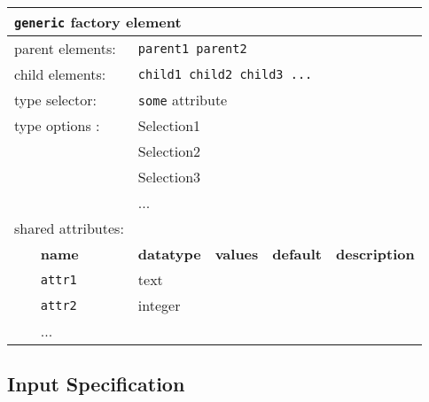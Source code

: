 \begin{table}[h]
\begin{center}
\begin{tabularx}{\textwidth}{l l l l l l }
\hline
\multicolumn{6}{l}{\texttt{generic} factory element} \\
\hline
\multicolumn{2}{l}{parent elements:} & \multicolumn{4}{l}{\texttt{parent1 parent2}}\\
\multicolumn{2}{l}{child  elements:} & \multicolumn{4}{l}{\texttt{child1 child2 child3 ...}}\\
\multicolumn{2}{l}{type   selector:} & \multicolumn{4}{l}{\texttt{some} attribute}\\
\multicolumn{2}{l}{type   options :} & \multicolumn{4}{l}{Selection1}\\
\multicolumn{2}{l}{                } & \multicolumn{4}{l}{Selection2}\\
\multicolumn{2}{l}{                } & \multicolumn{4}{l}{Selection3}\\
\multicolumn{2}{l}{                } & \multicolumn{4}{l}{...}\\
\multicolumn{2}{l}{shared attributes:} & \multicolumn{4}{l}{}\\
   &   \bfseries name     & \bfseries datatype & \bfseries values & \bfseries default   & \bfseries description \\
   &   \texttt{attr1}     &  text              &                  &                     &                       \\
   &   \texttt{attr2}     &  integer           &                  &                     &                       \\
   &   ...                &                    &                  &                     &                       \\
  \hline
\end{tabularx}
\end{center}
\end{table}




\subsection{Input Specification}



